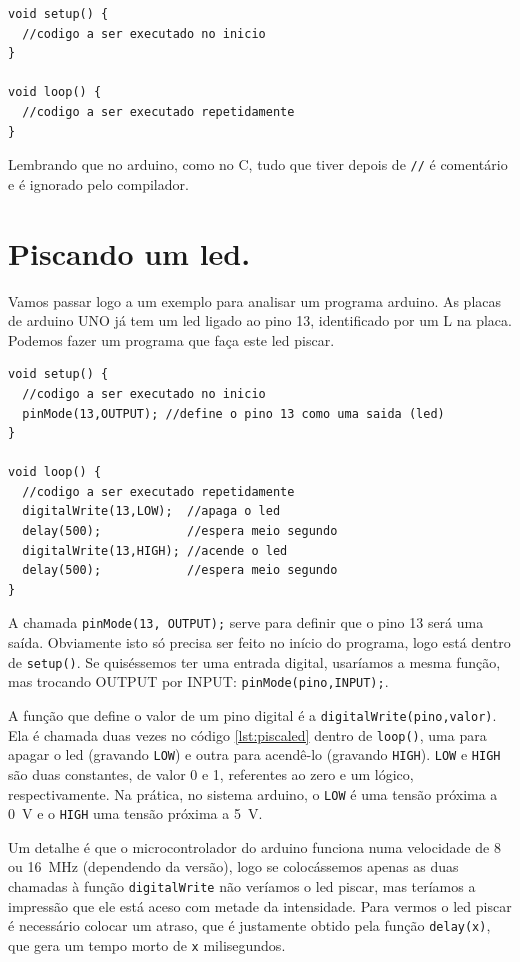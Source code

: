 \begin{lstlisting}[caption=Esqueleto de um programa arduino., label=lst:ardEsquel]
void setup() {
  //codigo a ser executado no inicio
}

void loop() {
  //codigo a ser executado repetidamente
}
 \end{lstlisting}

Lembrando que no arduino, como no C, tudo que tiver depois de \lstinline|//| é comentário e é ignorado pelo compilador.

\section{Piscando um led.}
Vamos passar logo a um exemplo para analisar um programa arduino. As placas de arduino UNO já tem um led ligado ao pino 13, identificado por um L na placa. Podemos fazer um programa que faça este led piscar.

\begin{lstlisting}[caption= Programa para piscar led.,label=lst:piscaled]
void setup() {
  //codigo a ser executado no inicio
  pinMode(13,OUTPUT); //define o pino 13 como uma saida (led)
}

void loop() {
  //codigo a ser executado repetidamente
  digitalWrite(13,LOW);  //apaga o led
  delay(500);            //espera meio segundo
  digitalWrite(13,HIGH); //acende o led
  delay(500);            //espera meio segundo
}	
\end{lstlisting}

A chamada \lstinline|pinMode(13, OUTPUT);| serve para definir que o pino 13 será uma saída. Obviamente isto só precisa ser feito no início do programa, logo está dentro de \lstinline|setup()|. Se quiséssemos ter uma entrada digital, usaríamos a mesma função, mas trocando OUTPUT por INPUT: \lstinline|pinMode(pino,INPUT);|.

A função que define o valor de um pino digital é a \lstinline|digitalWrite(pino,valor)|. Ela é chamada duas vezes no código \ref{lst:piscaled} dentro de \lstinline|loop()|, uma para apagar o led (gravando \lstinline|LOW|) e outra para acendê-lo (gravando \lstinline|HIGH|). \lstinline|LOW| e \lstinline|HIGH| são duas constantes, de valor 0 e 1, referentes ao zero e um lógico, respectivamente. Na prática, no sistema arduino, o \lstinline|LOW| é uma tensão próxima a \SI{0}{V} e o \lstinline|HIGH| uma tensão próxima a \SI{5}{V}.

Um detalhe é que o microcontrolador do arduino funciona numa velocidade de 8 ou \SI{16}{MHz} (dependendo da versão), logo se colocássemos apenas as duas chamadas à função \lstinline|digitalWrite| não veríamos o led piscar, mas teríamos a impressão que ele está aceso com metade da intensidade. Para vermos o led piscar é necessário colocar um atraso, que é justamente obtido pela função \lstinline|delay(x)|, que gera um tempo morto de \lstinline|x| milisegundos.

